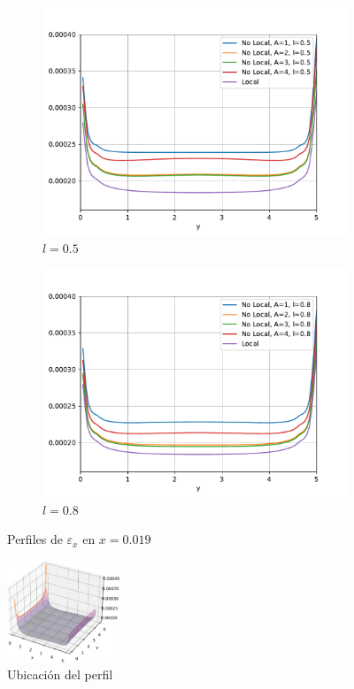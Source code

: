 \begin{figure}
\begin{subfigure}{0.48\textwidth}
		    \centering
		        \includegraphics[width=\textwidth]{figuras/Placa/Perfiles/X/X0.5_0.019.pdf}
		        \caption{$l=0.5$}
		        \label{fig:perfilesX0019.05}
		    \end{subfigure}
		    \begin{subfigure}{0.48\textwidth}
		    \centering
		        \includegraphics[width=\textwidth]{figuras/Placa/Perfiles/X/X0.8_0.019.pdf}
		        \caption{$l=0.8$}
		        \label{fig:perfilesX0019.08}
		    \end{subfigure}
		    \caption{Perfiles de $\varepsilon_x$ en $x=0.019$}
		    \label{fig:perfilesX0019}
		\end{figure}
	\begin{figure}
		\sffamily
		\begin{center}
			\includegraphics[width=0.3\textwidth]{figuras/Placa/defx_bonita_X0.019.pdf}
		\end{center}
		\caption{Ubicación del perfil}
		\label{fig:defxbonitax0019}
	\end{figure}
